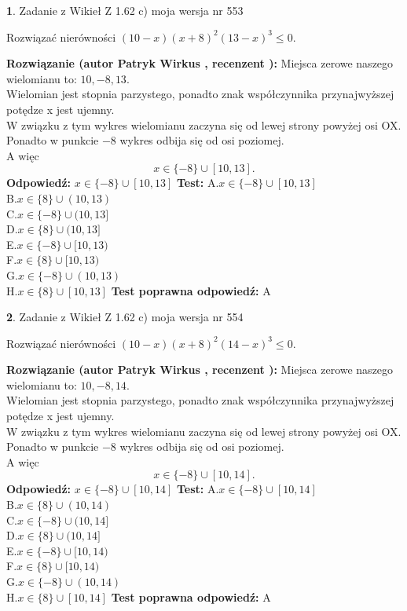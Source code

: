 \documentclass[12pt, a4paper]{article}
\theoremstyle{definition} %
\newtheorem{zad}{}
\newcommand{\zadStart}[1]{\begin{zad}#1\newline}
\newcommand{\zadStop}{\end{zad}}
\newcommand{\rozwStart}[2]{\noindent \textbf{Rozwiązanie (autor #1 , recenzent #2): }\newline}
\newcommand{\rozwStop}{\newline}
\newcommand{\odpStart}{\noindent \textbf{Odpowiedź:}\newline}
\newcommand{\odpStop}{\newline}
\newcommand{\testStart}{\noindent \textbf{Test:}\newline}
\newcommand{\testStop}{\newline}
\newcommand{\kluczStart}{\noindent \textbf{Test poprawna odpowiedź:}\newline}
\newcommand{\kluczStop}{\newline}
\begin{document}
\zadStart{Zadanie z Wikieł Z 1.62 c) moja wersja nr 553}

Rozwiązać nierówności $(10-x)(x+8)^{2}(13-x)^{3}\le0$.
\zadStop
\rozwStart{Patryk Wirkus}{}
Miejsca zerowe naszego wielomianu to: $10, -8, 13$.\\
Wielomian jest stopnia parzystego, ponadto znak współczynnika przy\linebreak najwyższej potędze x jest ujemny.\\ W związku z tym wykres wielomianu zaczyna się od lewej strony powyżej osi OX.\\
Ponadto w punkcie $-8$ wykres odbija się od osi poziomej.\\
A więc $$x \in \{-8\} \cup [10,13].$$
\rozwStop
\odpStart
$x \in \{-8\} \cup [10,13]$
\odpStop
\testStart
A.$x \in \{-8\} \cup [10,13]$\\
B.$x \in \{8\} \cup (10,13)$\\
C.$x \in \{-8\} \cup (10,13]$\\
D.$x \in \{8\} \cup (10,13]$\\
E.$x \in \{-8\} \cup [10,13)$\\
F.$x \in \{8\} \cup [10,13)$\\
G.$x \in \{-8\} \cup (10,13)$\\
H.$x \in \{8\} \cup [10,13]$
\testStop
\kluczStart
A
\kluczStop



\zadStart{Zadanie z Wikieł Z 1.62 c) moja wersja nr 554}

Rozwiązać nierówności $(10-x)(x+8)^{2}(14-x)^{3}\le0$.
\zadStop
\rozwStart{Patryk Wirkus}{}
Miejsca zerowe naszego wielomianu to: $10, -8, 14$.\\
Wielomian jest stopnia parzystego, ponadto znak współczynnika przy\linebreak najwyższej potędze x jest ujemny.\\ W związku z tym wykres wielomianu zaczyna się od lewej strony powyżej osi OX.\\
Ponadto w punkcie $-8$ wykres odbija się od osi poziomej.\\
A więc $$x \in \{-8\} \cup [10,14].$$
\rozwStop
\odpStart
$x \in \{-8\} \cup [10,14]$
\odpStop
\testStart
A.$x \in \{-8\} \cup [10,14]$\\
B.$x \in \{8\} \cup (10,14)$\\
C.$x \in \{-8\} \cup (10,14]$\\
D.$x \in \{8\} \cup (10,14]$\\
E.$x \in \{-8\} \cup [10,14)$\\
F.$x \in \{8\} \cup [10,14)$\\
G.$x \in \{-8\} \cup (10,14)$\\
H.$x \in \{8\} \cup [10,14]$
\testStop
\kluczStart
A
\kluczStop
\end{document}
